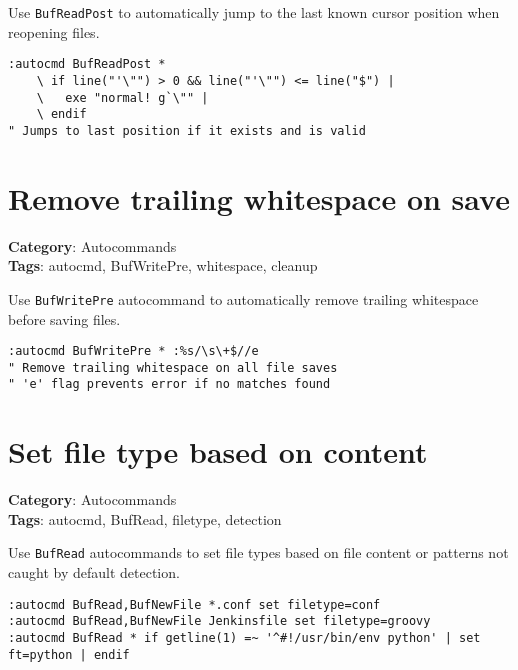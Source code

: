 {Use {\footnotesize \Verb§BufReadPost§} to automatically jump to the last known cursor position when reopening files.

\begin{Exa*}{}
\begin{Verbatim}[fontsize=\footnotesize, breaklines, breakanywhere]
:autocmd BufReadPost * 
    \ if line("'\"") > 0 && line("'\"") <= line("$") |
    \   exe "normal! g`\"" |
    \ endif
" Jumps to last position if it exists and is valid
\end{Verbatim}
\end{Exa*}

\section{Remove trailing whitespace on save}

\textbf{Category}: Autocommands\\ \textbf{Tags}: autocmd, BufWritePre, whitespace, cleanup
\vspace{0.5cm}

Use {\footnotesize \Verb§BufWritePre§} autocommand to automatically remove trailing whitespace before saving files.

\begin{Exa*}{}
\begin{Verbatim}[fontsize=\footnotesize, breaklines, breakanywhere]
:autocmd BufWritePre * :%s/\s\+$//e
" Remove trailing whitespace on all file saves
" 'e' flag prevents error if no matches found
\end{Verbatim}
\end{Exa*}

\section{Set file type based on content}

\textbf{Category}: Autocommands\\ \textbf{Tags}: autocmd, BufRead, filetype, detection
\vspace{0.5cm}

Use {\footnotesize \Verb§BufRead§} autocommands to set file types based on file content or patterns not caught by default detection.

\begin{Exa*}{}
\begin{Verbatim}[fontsize=\footnotesize, breaklines, breakanywhere]
:autocmd BufRead,BufNewFile *.conf set filetype=conf
:autocmd BufRead,BufNewFile Jenkinsfile set filetype=groovy  
:autocmd BufRead * if getline(1) =~ '^#!/usr/bin/env python' | set ft=python | endif
\end{Verbatim}
\end{Exa*}

}

